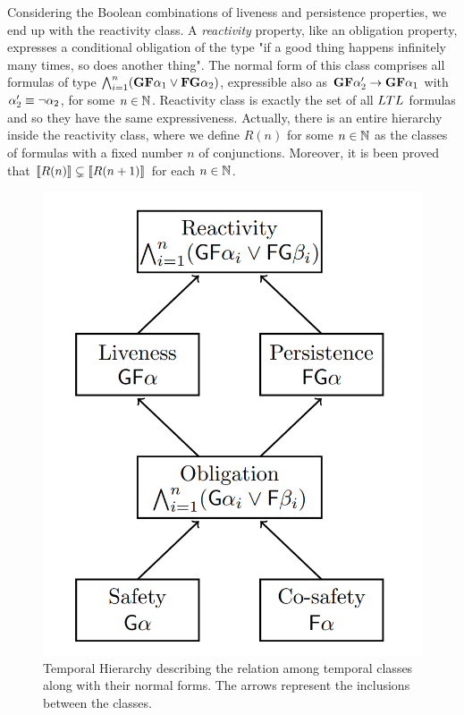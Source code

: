 Considering the Boolean combinations of liveness and persistence properties, we end up with the reactivity class. A \textit{reactivity} property, like an obligation property, expresses a conditional obligation of the type "if a good thing happens infinitely many times, so does another thing". The normal form of this class comprises all formulas of type $\bigwedge_{i=1}^{n}(\mathbf{G} \mathbf{F} \alpha_1 \lor \mathbf{F} \mathbf{G} \alpha_2)$, expressible also as $\mathbf{G} \mathbf{F} \alpha_2' \to \mathbf{G} \mathbf{F} \alpha_1$ with $\alpha_2' \equiv \neg \alpha_2$, for some $n \in \mathbb{N}$. Reactivity class is exactly the set of all $LTL$ formulas and so they have the same expressiveness.
Actually, there is an entire hierarchy inside the reactivity class, where we define $R(n)$ for some $n \in \mathbb{N}$ as the classes of formulas with a fixed number $n$ of conjunctions.
Moreover, it is been proved that $\llbracket R(n) \rrbracket \subsetneq \llbracket R(n+1) \rrbracket$ for each $n \in \mathbb{N}$.


\begin{figure}[!htp]
    \centering
    \includegraphics[width=0.4\linewidth]{figures/temporal-hierarchy.png}
    \caption{\cite{pnueli1990} Temporal Hierarchy describing the relation among temporal classes along with their normal forms. The arrows represent the inclusions between the classes.}
    \label{fig:temporal-hierarchy}
\end{figure}
